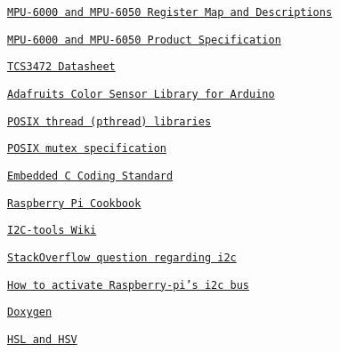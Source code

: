 \begin{DoxyItemize}
\item \href{https://invensense.tdk.com/wp-content/uploads/2015/02/MPU-6000-Register-Map1.pdf}{\tt M\+P\+U-\/6000 and M\+P\+U-\/6050 Register Map and Descriptions}
\item \href{https://invensense.tdk.com/wp-content/uploads/2015/02/MPU-6000-Datasheet1.pdf}{\tt M\+P\+U-\/6000 and M\+P\+U-\/6050 Product Specification}
\item \href{https://cdn-shop.adafruit.com/datasheets/TCS34725.pdf}{\tt T\+C\+S3472 Datasheet}
\item \href{https://github.com/adafruit/Adafruit_TCS34725}{\tt Adafruit\textquotesingle{}s Color Sensor Library for Arduino}
\item \href{https://www.cs.cmu.edu/afs/cs/academic/class/15492-f07/www/pthreads.html}{\tt P\+O\+S\+IX thread (pthread) libraries}
\item \href{https://pubs.opengroup.org/onlinepubs/9699919799/functions/pthread_mutex_lock.html}{\tt P\+O\+S\+IX mutex specification}
\item \href{https://barrgroup.com/embedded-systems/books/embedded-c-coding-standard}{\tt Embedded C Coding Standard}
\item \href{https://books.google.es/books?id=T0JRAgAAQBAJ&printsec=frontcover&hl=es#v=onepage&q&f=false}{\tt Raspberry Pi Cookbook}
\item \href{https://www.mankier.com/package/i2c-tools}{\tt I2\+C-\/tools Wiki}
\item \href{https://stackoverflow.com/questions/52975817/setup-i2c-reading-and-writing-in-c-language}{\tt Stack\+Overflow question regarding i2c}
\item \href{https://openest.io/en/services/activate-raspberry-pi-4-i2c-bus/}{\tt How to activate Raspberry-\/pi’s i2c bus}
\item \href{https://www.doxygen.nl/index.html}{\tt Doxygen}
\item \href{https://en.wikipedia.org/wiki/HSL_and_HSV}{\tt H\+SL and H\+SV} 
\end{DoxyItemize}